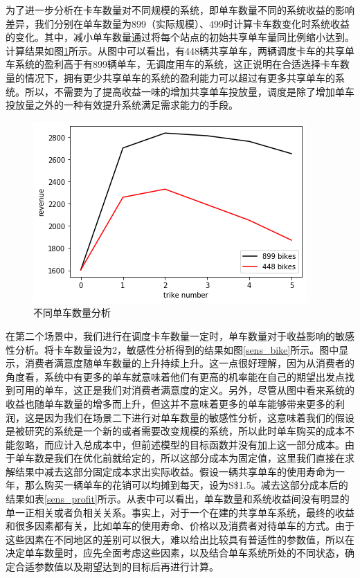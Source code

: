 \documentclass[]{tongjithesis}
\numberwithin{equation}{chapter}
\begin{document}
为了进一步分析在卡车数量对不同规模的系统，即单车数量不同的系统收益的影响差异，我们分别在单车数量为899（实际规模）、499时计算卡车数变化时系统收益的变化。其中，减小单车数量通过将每个站点的初始共享单车量同比例缩小达到。计算结果如图\ref{trike_compare}所示。从图中可以看出，有448辆共享单车，两辆调度卡车的共享单车系统的盈利高于有899辆单车，无调度用车的系统，这正说明在合适选择卡车数量的情况下，拥有更少共享单车的系统的盈利能力可以超过有更多共享单车的系统。所以，不需要为了提高收益一味的增加共享单车投放量，调度是除了增加单车投放量之外的一种有效提升系统满足需求能力的手段。

\begin{figure}[H]
    \centering
    \includegraphics[width=0.6 \textwidth]{figures_main/sens_trike_compare.png}
    \caption{不同单车数量分析}
    \label{trike_compare}
\end{figure}

在第二个场景中，我们进行在调度卡车数量一定时，单车数量对于收益影响的敏感性分析。将卡车数量设为2，敏感性分析得到的结果如图\ref{sens_bike}所示。图中显示，消费者满意度随单车数量的上升持续上升。这一点很好理解，因为从消费者的角度看，系统中有更多的单车就意味着他们有更高的机率能在自己的期望出发点找到可用的单车，这正是我们对消费者满意度的定义。另外，尽管从图中看来系统的收益也随单车数量的增多而上升，但这并不意味着更多的单车能够带来更多的利润，这是因为我们在场景二下进行对单车数量的敏感性分析，这意味着我们的假设是被研究的系统是一个新的或者需要改变规模的系统，所以此时单车购买的成本不能忽略，而应计入总成本中，但前述模型的目标函数并没有加上这一部分成本。由于单车数是我们在优化前就给定的，所以这部分成本为固定值，这里我们直接在求解结果中减去这部分固定成本求出实际收益。假设一辆共享单车的使用寿命为一年，那么购买一辆单车的花销可以均摊到每天，设为S\$1.5。减去这部分成本后的结果如表\ref{sens_profit}所示。从表中可以看出，单车数量和系统收益间没有明显的单一正相关或者负相关关系。事实上，对于一个在建的共享单车系统，最终的收益和很多因素都有关，比如单车的使用寿命、价格以及消费者对待单车的方式。由于这些因素在不同地区的差别可以很大，难以给出比较具有普适性的参数值，所以在决定单车数量时，应先全面考虑这些因素，以及结合单车系统所处的不同状态，确定合适参数值以及期望达到的目标后再进行计算。
\end{document}

